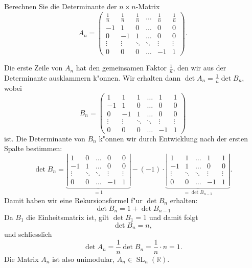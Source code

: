 Berechnen Sie die Determinante der $n\times n$-Matrix 
\[
A_n=\begin{pmatrix}
\frac1n& \frac1n& \frac1n&\dots & \frac1n& \frac1n\\
     -1&       1&       0&\dots &       0&       0\\
      0&      -1&       1&\dots &       0&       0\\
\vdots &\vdots  &\ddots  &\ddots& \vdots & \vdots \\
      0&       0&       0&\dots &      -1&       1
\end{pmatrix}.
\]

\begin{loesung}
Die erste Zeile von $A_n$ hat den gemeinsamen Faktor $\frac1n$, den
wir aus der Determinante ausklammern k"onnen.
Wir erhalten dann $\det A_n =\frac1n\det B_n $, wobei 
\[
B_n=\begin{pmatrix}
      1&       1&       1&\dots &       1&       1\\
     -1&       1&       0&\dots &       0&       0\\
      0&      -1&       1&\dots &       0&       0\\
\vdots &\vdots  &\ddots  &\ddots& \vdots & \vdots \\
      0&       0&       0&\dots &      -1&       1
\end{pmatrix}
\]
ist.
Die Determinante von $B_n$ k"onnen wir durch Entwicklung nach der ersten
Spalte bestimmen:
\[
\det B_n
=
\underbrace{
\left|\begin{matrix}
       1&       0&\dots &       0&       0\\
      -1&       1&\dots &       0&       0\\
\vdots  &\ddots  &\ddots& \vdots & \vdots \\
       0&       0&\dots &      -1&       1
\end{matrix}\right|}_{=1}
-(-1)\cdot
\underbrace{
\left|\begin{matrix}
       1&       1&\dots &       1&       1\\
      -1&       1&\dots &       0&       0\\
\vdots  &\ddots  &\ddots& \vdots & \vdots \\
       0&       0&\dots &      -1&       1
\end{matrix}\right|}_{=\det B_{n-1}}.
\]
Damit haben wir eine Rekursionsformel f"ur $\det B_n$ erhalten:
\[
\det B_n = 1 + \det B_{n-1}
\]
Da $B_1$ die Einheitsmatrix ist, gilt $\det B_1=1$ und damit folgt
\[
\det B_n=n,
\]
und schliesslich
\[
\det A_n=\frac1n\det B_n=\frac1n\cdot n=1.
\]
Die Matrix $A_n$ ist also unimodular, $A_n\in\operatorname{SL}_n(\mathbb R)$.
\end{loesung}

